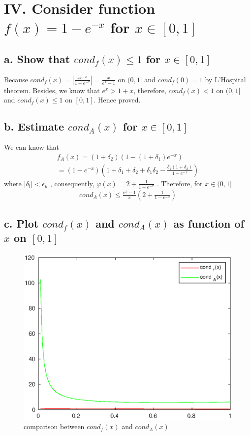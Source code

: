 \documentclass[twoside,a4paper]{article}
\begin{document}
\section*{IV. Consider function $f(x)=1-e^{-x}$ for $x\in[0,1]$}
\subsection*{a. Show that $cond_f(x)\leq 1$ for $x\in[0,1]$}
Because $cond_f(x)=|\frac{xe^{-x}}{1-e^{-x}}|=\frac{x}{e^x-1}$ on $(0,1]$ and $cond_f(0)=1$ by L'Hospital theorem. Besides, we know that $e^x>1+x$, therefore, $cond_f(x) < 1$ on $(0,1]$ and  $cond_f(x) \leq 1$ on $[0,1]$. Hence proved.
\subsection*{b. Estimate $cond_{A}(x)$ for $x\in[0,1]$}
We can know that
\begin{gather}
f_A(x)=(1+\delta_2)(1-(1+\delta_1)e^{-x})\\
=(1-e^{-x})(1+\delta_1+\delta_2+\delta_1\delta_2-\frac{\delta_1(1+\delta_2)}{1-e^{-x}})
\end{gather}
where $|\delta_i|<\epsilon_u$ , consequently, $\varphi(x)=2+\frac{1}{1-e^{-x}}$ . Therefore, for $x\in(0,1]$
\begin{gather}
cond_A(x)\leq \frac{e^x-1}{x}(2+\frac{1}{1-e^{-x}})
\end{gather}

\subsection*{c. Plot $cond_f(x)$ and $cond_A(x)$ as function of $x$ on $[0,1]$}
\begin{figure}[H]
\includegraphics[width=5in]{./figure/comparison.eps}
\caption{comparison between $cond_f(x)$ and $cond_A(x)$}
\end{figure}
\end{document}

